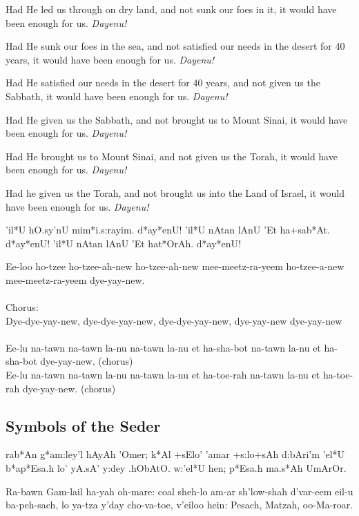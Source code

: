 \documentclass[12pt]{article}
\newenvironment{hebrewPrayer}
    {\begin{cjhebrew}
     \Large
    }
    { 
    \end{cjhebrew}
    }
\newenvironment{hebrewTransliteration}{}{\par}
\begin{document}
Had He led us through on dry land, and not sunk our foes in it, it would have been enough for us. \textit{Dayenu!}

Had He sunk our foes in the sea, and not satisfied our needs in the desert for 40 years, it would have been enough for us. \textit{Dayenu!}

Had He satisfied our needs in the desert for 40 years, and not given us the Sabbath, it would have been enough for us. \textit{Dayenu!}

Had He given us the Sabbath, and not brought us to Mount Sinai, it would have been enough for us. \textit{Dayenu!}

Had He brought us to Mount Sinai, and not given us the Torah, it would have been enough for us. \textit{Dayenu!}

Had he given us the Torah, and not brought us into the Land of Israel, it would have been enough for us. \textit{Dayenu!}


\begin{hebrewPrayer}
          'il*U hO.sy'nU mim*i.s:rayim\textrm{.} d*ay*enU\textrm{!} 'il*U nAtan lAnU 'Et ha+sab*At\textrm{.} d*ay*enU\textrm{!} 'il*U nAtan lAnU 'Et hat*OrAh\textrm{.} d*ay*enU\textrm{!}
\end{hebrewPrayer}

\begin{hebrewTransliteration}
    Ee-loo ho-tzee ho-tzee-ah-new ho-tzee-ah-new mee-meetz-ra-yeem ho-tzee-a-new mee-meetz-ra-yeem dye-yay-new. \\ \\
    Chorus: \\
    Dye-dye-yay-new, dye-dye-yay-new, dye-dye-yay-new, dye-yay-new dye-yay-new \\ \\
    Ee-lu na-tawn na-tawn la-nu na-tawn la-nu et ha-sha-bot na-tawn la-nu et ha-sha-bot dye-yay-new. (chorus) \\
    Ee-lu na-tawn na-tawn la-nu na-tawn la-nu et ha-toe-rah na-tawn la-nu et ha-toe-rah dye-yay-new. (chorus)
\end{hebrewTransliteration}

\begin{minipage}[t]{\textwidth}
    \subsection*{Symbols of the Seder}
    \begin{hebrewPrayer}
        rab*An g*am:ley'l hAyAh 'Omer; k*Al +sElo' 'amar +s:lo+sAh d:bAri'm 'el*U b*ap*Esa.h lo' yA.sA' y:dey .hObAtO\textrm{.} w:'el*U hen{}; p*Esa.h ma.s*Ah UmArOr\textrm{.}
    \end{hebrewPrayer}
    
    \begin{hebrewTransliteration}
        Ra-bawn Gam-lail ha-yah oh-mare: coal sheh-lo am-ar sh'low-shah d'var-eem eil-u ba-peh-sach, lo ya-tza y'day cho-va-toe, v'eiloo hein: Pesach, Matzah, oo-Ma-roar.
    \end{hebrewTransliteration}
\end{minipage}
\end{document}
